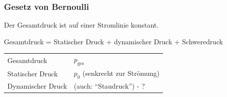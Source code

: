 \documentclass{beamer}
\begin{document}
\begin{frame}
\end{frame}




\begin{frame}
\frametitle{Gesetz von Bernoulli}

Der Gesamtdruck ist auf einer Stromlinie konstant. \\[0.5 cm]

\pause

Gesamtdruck = Statischer Druck + dynamischer Druck + Schweredruck \\[0.5 cm]


\begin{tabular}{ll}
Gesamtdruck     & \(p_{\text{ges}}\)     \\[0.2 cm]
Statischer Druck        & \(p_0\)  (senkrecht zur Strömung)   \\[0.2 cm]
Dynamischer Druck       & (auch: ``Staudruck'') \pause - ? \\
\end{tabular}


\end{frame}
\end{document}
